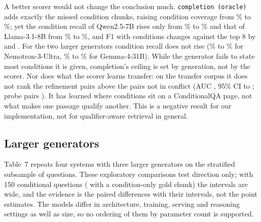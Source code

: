 A better scorer would not change the conclusion much. \texttt{completion (oracle)} adds exactly the missed condition chunks, raising condition coverage from \revOracleCondQwenCtxBase\% to \revOracleCondQwenCtx\%; yet the condition recall of Qwen2.5-7B rises only from \revOracleCondQwenRecallBase\% to \revOracleCondQwenRecall\% and that of Llama-3.1-8B from \revOracleCondLlamaRecallBase\% to \revOracleCondLlamaRecall\%, and F1 with conditions changes against the top 8 by \revOracleCondQwen{} and \revOracleCondLlama{}. For the two larger generators condition recall does not rise (\revOracleCondNemoRecallBase\% to \revOracleCondNemoRecall\% for Nemotron-3-Ultra, \revOracleCondGemmaRecallBase\% to \revOracleCondGemmaRecall\% for Gemma-4-31B). While the generator fails to state most conditions it is given, completion's ceiling is set by generation, not by the scorer. Nor does what the scorer learns transfer: on the transfer corpus it does not rank the \oodPosNatural{} refinement pairs above the \oodNegNatural{} pairs not in conflict (AUC \oodAucNatural, 95\% CI \oodAucNaturalLow{} to \oodAucNaturalHigh; probe pairs \oodAucProbes). It has learned where conditions sit on a ConditionalQA page, not what makes one passage qualify another. This is a negative result for our implementation, not for qualifier-aware retrieval in general.

\subsection{Larger generators}
\label{sec:hosted}

Table~7 repeats four systems with three larger generators on the stratified subsample of \nHostedQ{} questions. These exploratory comparisons test direction only; with 150 conditional questions (\hCondOnlyN{} with a condition-only gold chunk) the intervals are wide, and the evidence is the paired differences with their intervals, not the point estimates. The models differ in architecture, training, serving and reasoning settings as well as size, so no ordering of them by parameter count is supported.

